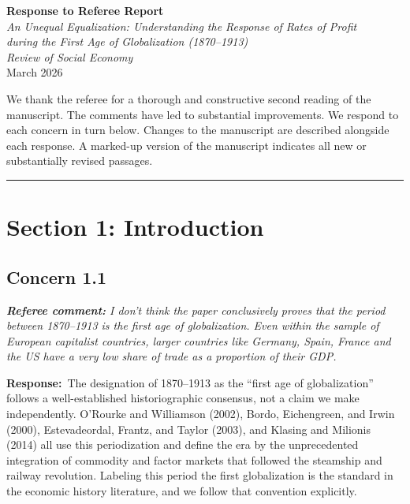 \documentclass[11pt]{article}
\newcommand{\RC}[1]{\begin{refereebox}\textit{\textbf{Referee comment:} #1}\end{refereebox}}
\newcommand{\AR}{\noindent\textbf{Response:}\ }
\begin{document}
\begin{center}
{\LARGE \textbf{Response to Referee Report}}\\[1em]
{\large \textit{An Unequal Equalization: Understanding the Response of Rates of Profit\\
during the First Age of Globalization (1870--1913)}}\\[0.5em]
{\normalsize \textit{Review of Social Economy}}\\[0.5em]
{\normalsize March 2026}
\end{center}

\bigskip

We thank the referee for a thorough and constructive second reading of the manuscript. The comments have led to substantial improvements. We respond to each concern in turn below. Changes to the manuscript are described alongside each response. A marked-up version of the manuscript indicates all new or substantially revised passages.

\bigskip\noindent\rule{\textwidth}{0.4pt}\bigskip

\section*{Section 1: Introduction}

\subsection*{Concern 1.1}

\RC{I don't think the paper conclusively proves that the period between 1870--1913 is the first age of globalization. Even within the sample of European capitalist countries, larger countries like Germany, Spain, France and the US have a very low share of trade as a proportion of their GDP.}

\AR The designation of 1870--1913 as the ``first age of globalization'' follows a well-established historiographic consensus, not a claim we make independently. O'Rourke and Williamson (2002), Bordo, Eichengreen, and Irwin (2000), Estevadeordal, Frantz, and Taylor (2003), and Klasing and Milionis (2014) all use this periodization and define the era by the unprecedented integration of commodity and factor markets that followed the steamship and railway revolution. Labeling this period the first globalization is the standard in the economic history literature, and we follow that convention explicitly.
\end{document}
